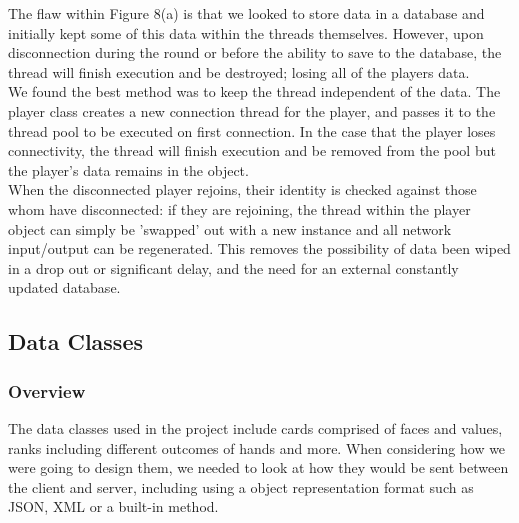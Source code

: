 \documentclass[11pt]{article}
\begin{document}
The flaw within Figure 8(a) is that we looked to store data in a database and initially kept some of this data within the threads themselves. However, upon disconnection during the round or before the ability to save to the database, the thread will finish execution and be destroyed; losing all of the players data. \\

We found the best method was to keep the thread independent of the data. The player class creates a new connection thread for the player, and passes it to the thread pool to be executed on first connection. In the case that the player loses connectivity, the thread will finish execution and be removed from the pool but the player's data remains in the object. \\

When the disconnected player rejoins, their identity is checked against those whom have disconnected: if they are rejoining, the thread within the player object can simply be 'swapped' out with a new instance and all network input/output can be regenerated. This removes the possibility of data been wiped in a drop out or significant delay, and the need for an external constantly updated database.


%	
%	
%	


\newpage

\subsection{Data Classes}


\subsubsection{Overview}
The data classes used in the project include cards comprised of faces and values, ranks including different outcomes of hands and more. When considering how we were going to design them, we needed to look at how they would be sent between the client and server, including using a object representation format such as JSON, XML or a built-in method.
\end{document}
